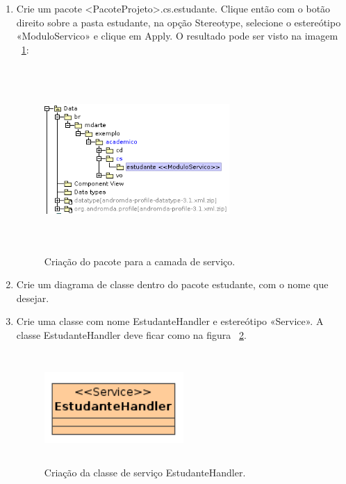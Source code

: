 \begin{enumerate}
\item Crie um pacote <PacoteProjeto>.cs.estudante. Clique então com o botão
direito sobre a pasta estudante, na opção Stereotype, selecione o estereótipo
 «ModuloServico» e clique em Apply. O resultado pode ser visto na imagem
 ~\ref{cria_pacote_servico}:
 \begin{figure}[!htb]
	\centering
	\includegraphics[width=200pt,height=200pt]{imgs/tutorial-mdarte-0008.png}
	\caption{Criação do pacote para a camada de serviço.}
	\label{cria_pacote_servico}
\end{figure} 
	
\item Crie um diagrama de classe dentro do pacote estudante, com o nome que desejar.
	
\item Crie uma classe com nome EstudanteHandler e estereótipo «Service». A
classe EstudanteHandler deve ficar como na figura ~\ref{cria_sevico_estudante}.
\begin{figure}[!htb]
	\centering
	\includegraphics[width=150pt,height=120pt]{imgs/tutorial-mdarte-0009.png}
	\caption{Criação da classe de serviço EstudanteHandler.}
	\label{cria_sevico_estudante}
\end{figure} 
	

\end{enumerate}

